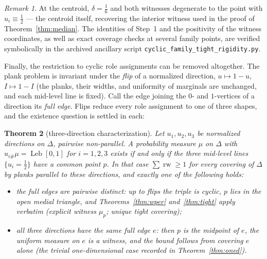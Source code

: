 \documentclass[11pt,reqno]{amsart}
\theoremstyle{plain}
\newtheorem{theorem}{Theorem}[section]
\theoremstyle{definition}
\theoremstyle{remark}
\newtheorem{remark}[theorem]{Remark}
\newcommand{\rw}{\operatorname{rw}}
\newcommand{\Leb}{\operatorname{Leb}}
\begin{document}
\begin{remark}
At the centroid, $\delta=\tfrac16$ and both witnesses degenerate to the point
with $u_i\equiv\tfrac12$ --- the centroid itself, recovering the interior
witness used in the proof of Theorem~\ref{thm:median}. The identities of Step~1
and the positivity of the witness coordinates, as well as exact coverage checks
at several family points, are verified symbolically in the archived ancillary
script \texttt{cyclic\_family\_tight\_rigidity.py}.
\end{remark}

Finally, the restriction to cyclic role assignments can be removed altogether.
The plank problem is invariant under the \emph{flip} of a normalized direction,
$u\mapsto1-u$, $I\mapsto1-I$ (the planks, their widths, and uniformity of
marginals are unchanged, and each mid-level line is fixed). Call the edge
joining the $0$- and $1$-vertices of a direction its \emph{full edge}. Flips
reduce every role assignment to one of three shapes, and the existence question
is settled in each:

\begin{theorem}[three-direction characterization]\label{thm:char}
Let $u_1,u_2,u_3$ be normalized directions on $\Delta$, pairwise non-parallel.
A probability measure $\mu$ on $\Delta$ with $u_{i\#}\mu=\Leb[0,1]$ for
$i=1,2,3$ exists if and only if the three mid-level lines $\{u_i=\tfrac12\}$
have a common point $p$. In that case $\sum\rw\ge1$ for every covering of
$\Delta$ by planks parallel to these directions, and exactly one of the
following holds:
\begin{itemize}
\item[(a)] the full edges are pairwise distinct: up to flips the triple is
cyclic, $p$ lies in the open medial triangle, and Theorems~\ref{thm:wper}
and~\ref{thm:tight} apply verbatim (explicit witness $\mu_p$; unique tight
covering);
\item[(b)] all three directions have the same full edge $e$: then $p$ is the
midpoint of $e$, the uniform measure on $e$ is a witness, and the bound follows
from covering $e$ alone (the trivial one-dimensional case recorded in
Theorem~\ref{thm:oned}).
\end{itemize}
\end{theorem}
\end{document}
